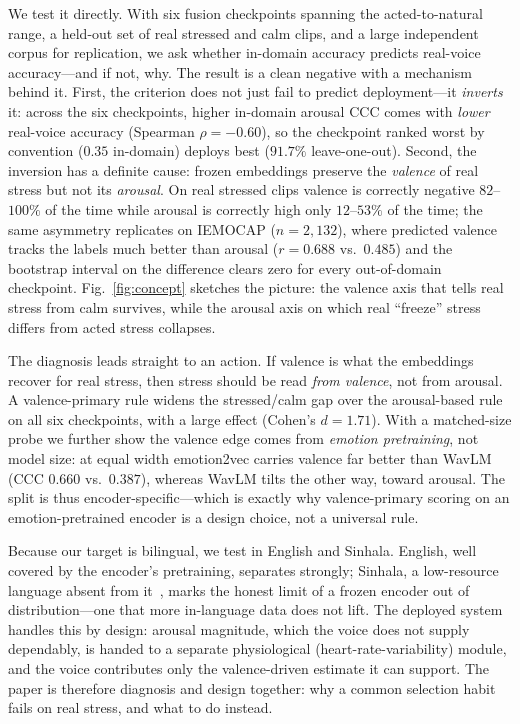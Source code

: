 \documentclass[conference]{IEEEtran}
\begin{document}
We test it directly. With six fusion checkpoints spanning the acted-to-natural
range, a held-out set of real stressed and calm clips, and a large independent
corpus for replication, we ask whether in-domain accuracy predicts real-voice
accuracy---and if not, why. The result is a clean negative with a mechanism behind
it. First, the criterion does not just fail to predict deployment---it
\emph{inverts} it: across the six checkpoints, higher in-domain arousal CCC comes
with \emph{lower} real-voice accuracy (Spearman $\rho = -0.60$), so the checkpoint
ranked worst by convention ($0.35$ in-domain) deploys best ($91.7\%$ leave-one-out).
Second, the inversion has a definite cause: frozen embeddings preserve the
\emph{valence} of real stress but not its \emph{arousal}. On real stressed clips
valence is correctly negative $82$--$100\%$ of the time while arousal is correctly
high only $12$--$53\%$ of the time; the same asymmetry replicates on IEMOCAP
($n = 2{,}132$), where predicted valence tracks the labels much better than
arousal ($r = 0.688$ vs.\ $0.485$) and the bootstrap interval on the difference
clears zero for every out-of-domain checkpoint. Fig.~\ref{fig:concept} sketches
the picture: the valence axis that tells real stress from calm survives, while the
arousal axis on which real ``freeze'' stress differs from acted stress collapses.

The diagnosis leads straight to an action. If valence is what the embeddings
recover for real stress, then stress should be read \emph{from valence}, not from
arousal. A valence-primary rule widens the stressed/calm gap over the arousal-based
rule on all six checkpoints, with a large effect (Cohen's $d = 1.71$). With a
matched-size probe we further show the valence edge comes from \emph{emotion
pretraining}, not model size: at equal width emotion2vec carries valence far
better than WavLM (CCC $0.660$ vs.\ $0.387$), whereas WavLM tilts the other way,
toward arousal. The split is thus encoder-specific---which is exactly why
valence-primary scoring on an emotion-pretrained encoder is a design choice, not a
universal rule.

Because our target is bilingual, we test in English and Sinhala. English, well
covered by the encoder's pretraining, separates strongly; Sinhala, a low-resource
language absent from it~\cite{sinhala_openslr}, marks the honest limit of a frozen
encoder out of distribution---one that more in-language data does not lift. The
deployed system handles this by design: arousal magnitude, which the voice does
not supply dependably, is handed to a separate physiological
(heart-rate-variability) module, and the voice contributes only the valence-driven
estimate it can support. The paper is therefore diagnosis and design together: why
a common selection habit fails on real stress, and what to do instead.
\end{document}
